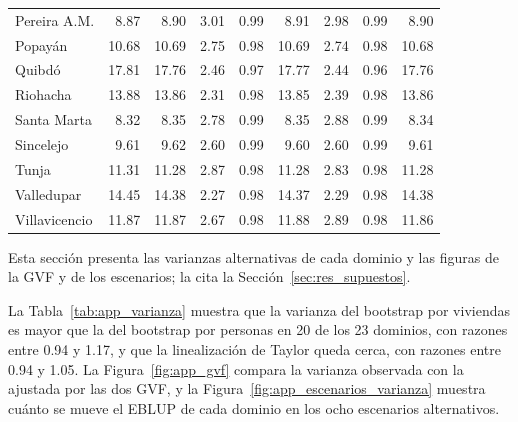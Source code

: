 {\begin{longtable}{l r r r r r r r r}
Pereira A.M. & 8.87 & 8.90 & 3.01 & 0.99 & 8.91 & 2.98 & 0.99 & 8.90 \\
Popayán & 10.68 & 10.69 & 2.75 & 0.98 & 10.69 & 2.74 & 0.98 & 10.68 \\
Quibdó & 17.81 & 17.76 & 2.46 & 0.97 & 17.77 & 2.44 & 0.96 & 17.76 \\
Riohacha & 13.88 & 13.86 & 2.31 & 0.98 & 13.85 & 2.39 & 0.98 & 13.86 \\
Santa Marta & 8.32 & 8.35 & 2.78 & 0.99 & 8.35 & 2.88 & 0.99 & 8.34 \\
Sincelejo & 9.61 & 9.62 & 2.60 & 0.99 & 9.60 & 2.60 & 0.99 & 9.61 \\
Tunja & 11.31 & 11.28 & 2.87 & 0.98 & 11.28 & 2.83 & 0.98 & 11.28 \\
Valledupar & 14.45 & 14.38 & 2.27 & 0.98 & 14.37 & 2.29 & 0.98 & 14.38 \\
Villavicencio & 11.87 & 11.87 & 2.67 & 0.98 & 11.88 & 2.89 & 0.98 & 11.86 \\
\end{longtable}
}
\label{app:varianza}

Esta sección presenta las varianzas alternativas de cada dominio y las figuras de la GVF y de los escenarios; la cita la Sección~\ref{sec:res_supuestos}.

La Tabla~\ref{tab:app_varianza} muestra que la varianza del bootstrap por viviendas es mayor que la del bootstrap por personas en 20 de los 23 dominios, con razones entre 0.94 y 1.17, y que la linealización de Taylor queda cerca, con razones entre 0.94 y 1.05. La Figura~\ref{fig:app_gvf} compara la varianza observada con la ajustada por las dos GVF, y la Figura~\ref{fig:app_escenarios_varianza} muestra cuánto se mueve el EBLUP de cada dominio en los ocho escenarios alternativos.

